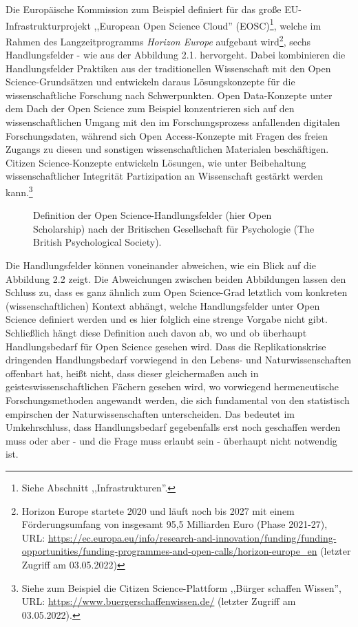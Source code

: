 Die Europäische Kommission zum Beispiel definiert für das große EU-Infrastrukturprojekt ,,European Open Science Cloud'' (EOSC)\footnote{Siehe Abschnitt ,,Infrastrukturen''.}, welche im Rahmen des Langzeitprogramms \textit{Horizon Europe} aufgebaut wird\footnote{Horizon Europe startete 2020 und läuft noch bis 2027 mit einem Förderungsumfang von insgesamt 95,5 Milliarden Euro (Phase 2021-27), URL: \url{https://ec.europa.eu/info/research-and-innovation/funding/funding-opportunities/funding-programmes-and-open-calls/horizon-europe_en} (letzter Zugriff am 03.05.2022)}, sechs Handlungsfelder - wie aus der Abbildung 2.1. hervorgeht. Dabei kombinieren die Handlungsfelder Praktiken aus der traditionellen Wissenschaft mit den Open Science-Grundsätzen und entwickeln daraus Lösungskonzepte für die wissenschaftliche Forschung nach Schwerpunkten. Open Data-Konzepte unter dem Dach der Open Science zum Beispiel konzentrieren sich auf den wissenschaftlichen Umgang mit den im Forschungsprozess anfallenden digitalen Forschungsdaten, während sich Open Access-Konzepte mit Fragen des freien Zugangs zu diesen und sonstigen wissenschaftlichen Materialen beschäftigen. Citizen Science-Konzepte entwickeln Lösungen, wie unter Beibehaltung wissenschaftlicher Integrität Partizipation an Wissenschaft gestärkt werden kann.\footnote{Siehe zum Beispiel die Citizen Science-Plattform ,,Bürger schaffen Wissen'', URL: \url{https://www.buergerschaffenwissen.de/} (letzter Zugriff am 03.05.2022).}

\begin{figure}[h]
    \centering
    \caption{Definition der Open Science-Handlungsfelder (hier Open Scholarship) nach der Britischen Gesellschaft für Psychologie (The British Psychological Society).\protect\footnotemark}
    \label{fig:x cubed graph}
\end{figure} 

Die Handlungsfelder können voneinander abweichen, wie ein Blick auf die Abbildung 2.2 zeigt. Die Abweichungen zwischen beiden Abbildungen lassen den Schluss zu, dass es ganz ähnlich zum Open Science-Grad letztlich vom konkreten (wissenschaftlichen) Kontext abhängt, welche Handlungsfelder unter Open Science definiert werden und es hier folglich eine strenge Vorgabe nicht gibt. Schließlich hängt diese Definition auch davon ab, wo und ob überhaupt Handlungsbedarf für Open Science gesehen wird. Dass die Replikationskrise dringenden Handlungsbedarf vorwiegend in den Lebens- und Naturwissenschaften offenbart hat, heißt nicht, dass dieser gleichermaßen auch in geisteswissenschaftlichen Fächern gesehen wird, wo vorwiegend hermeneutische Forschungsmethoden angewandt werden, die sich fundamental von den statistisch empirschen der Naturwissenschaften unterscheiden. Das bedeutet im Umkehrschluss, dass Handlungsbedarf gegebenfalls erst noch geschaffen werden muss oder aber - und die Frage muss erlaubt sein - überhaupt nicht notwendig ist. 

